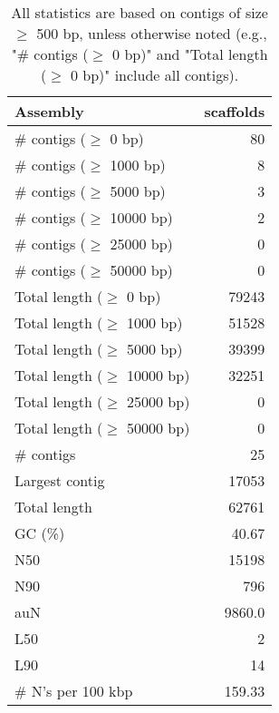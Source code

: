 \documentclass[12pt,a4paper]{article}
\begin{document}
\begin{table}[ht]
\begin{center}
\caption{All statistics are based on contigs of size $\geq$ 500 bp, unless otherwise noted (e.g., "\# contigs ($\geq$ 0 bp)" and "Total length ($\geq$ 0 bp)" include all contigs).}
\begin{tabular}{|l*{1}{|r}|}
\hline
Assembly & scaffolds \\ \hline
\# contigs ($\geq$ 0 bp) & 80 \\ \hline
\# contigs ($\geq$ 1000 bp) & 8 \\ \hline
\# contigs ($\geq$ 5000 bp) & 3 \\ \hline
\# contigs ($\geq$ 10000 bp) & 2 \\ \hline
\# contigs ($\geq$ 25000 bp) & 0 \\ \hline
\# contigs ($\geq$ 50000 bp) & 0 \\ \hline
Total length ($\geq$ 0 bp) & 79243 \\ \hline
Total length ($\geq$ 1000 bp) & 51528 \\ \hline
Total length ($\geq$ 5000 bp) & 39399 \\ \hline
Total length ($\geq$ 10000 bp) & 32251 \\ \hline
Total length ($\geq$ 25000 bp) & 0 \\ \hline
Total length ($\geq$ 50000 bp) & 0 \\ \hline
\# contigs & 25 \\ \hline
Largest contig & 17053 \\ \hline
Total length & 62761 \\ \hline
GC (\%) & 40.67 \\ \hline
N50 & 15198 \\ \hline
N90 & 796 \\ \hline
auN & 9860.0 \\ \hline
L50 & 2 \\ \hline
L90 & 14 \\ \hline
\# N's per 100 kbp & 159.33 \\ \hline
\end{tabular}
\end{center}
\end{table}
\end{document}
